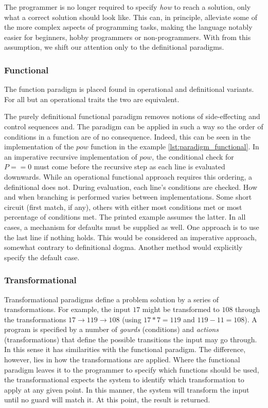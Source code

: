 The programmer is no longer required to specify \emph{how} to reach a solution, only what a correct solution should look like. This can, in principle, alleviate some of the more complex aspects of programming tasks, making the language notably easier for beginners, hobby programmers or non-programmers. With from this assumption, we shift our attention only to the definitional paradigms.

\subsubsection*{Functional}
The function paradigm is placed found in operational and definitional variants. For all but an operational traits the two are equivalent.

The purely definitional functional paradigm removes notions of side-effecting and control sequences and. The paradigm can be applied in such a way so the order of conditions in a function are of no consequence. Indeed, this can be seen in the implementation of the $pow$ function in the example \vref{lst:paradigm_functional}. In an imperative recursive implementation of $pow$, the conditional check for $P==0$ must come before the recursive step as each line is evaluated downwards. While an operational functional approach requires this ordering, a definitional does not. During evaluation, each line's conditions are checked. How and when branching is performed varies between implementations. Some short circuit (first match, if any), others with either most conditions met or most percentage of conditions met. The printed example assumes the latter. In all cases, a mechanism for defaults must be supplied as well. One approach is to use the last line if nothing holds. This would be considered an imperative approach, somewhat contrary to definitional dogma. Another method would explicitly specify the default case.

\subsubsection*{Transformational}
Transformational paradigms define a problem solution by a series of transformations. For example, the input $17$ might be transformed to $108$ through the transformations $17 \rightarrow 119 \rightarrow 108$ (using $17 * 7 = 119$ and $119 - 11 = 108$). A program is specified by a number of \emph{gourds} (conditions) and \emph{actions} (transformations) that define the possible transitions the input may go through. In this sense it has similarities with the functional paradigm. The difference, however, lies in how the transformations are applied. Where the functional paradigm leaves it to the programmer to specify which functions should be used, the transformational expects the system to identify which transformation to apply at any given point. In this manner, the system will transform the input until no guard will match it. At this point, the result is returned.

